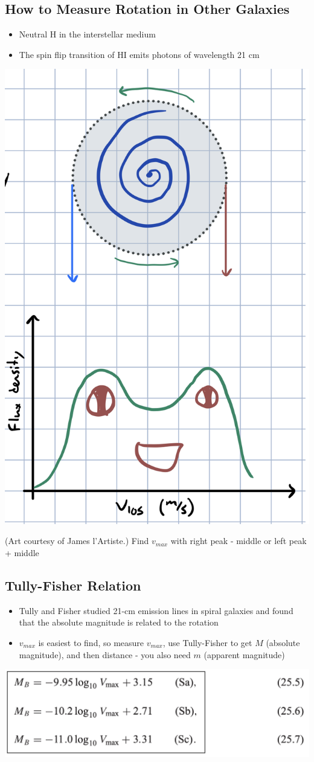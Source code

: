 \documentclass{book}
\begin{document}
\subsection{How to Measure Rotation in Other Galaxies}
\begin{itemize}
    \item Neutral H in the interstellar medium
    \item The spin flip transition of HI emits photons of wavelength 21 cm
\end{itemize}
\begin{center}
    \includegraphics[height = 0.5 \textwidth]{images/rotation.png}
\end{center}
(Art courtesy of James l'Artiste.) Find $v_{max}$ with right peak - middle or left peak + middle
\subsection{Tully-Fisher Relation}
\begin{itemize}
    \item Tully and Fisher studied 21-cm emission lines in spiral galaxies and found that the absolute magnitude is related to the rotation
    \item $v_{max}$ is easiest to find, so measure $v_{max}$, use Tully-Fisher to get $M$ (absolute magnitude), and then distance - you also need $m$ (apparent magnitude)
\end{itemize}
\begin{center}
    \includegraphics[width = \textwidth]{images/tullyfisher.png}
\end{center}
\end{document}
